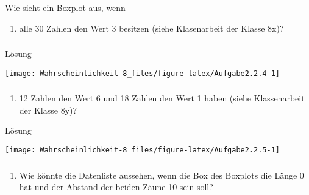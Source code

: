 \documentclass[
  ngerman,
]{book}
\providecommand{\tightlist}{%
  \setlength{\itemsep}{0pt}\setlength{\parskip}{0pt}}
\begin{document}
Wie sieht ein Boxplot aus, wenn

\begin{enumerate}
\def\labelenumi{\alph{enumi})}
\tightlist
\item
  alle 30 Zahlen den Wert 3 besitzen (siehe Klasenarbeit der Klasse 8x)?
\end{enumerate}

\hypertarget{section-30}{%
\subsubsection*{}\label{section-30}}

Lösung

\begin{center}\texttt{[image: Wahrscheinlichkeit-8\_files/figure-latex/Aufgabe2.2.4-1]} \end{center}

\hypertarget{section-31}{%
\subsubsection*{}\label{section-31}}

\begin{enumerate}
\def\labelenumi{\alph{enumi})}
\setcounter{enumi}{1}
\tightlist
\item
  12 Zahlen den Wert 6 und 18 Zahlen den Wert 1 haben (siehe Klassenarbeit der Klasse 8y)?
\end{enumerate}

Lösung

\begin{center}\texttt{[image: Wahrscheinlichkeit-8\_files/figure-latex/Aufgabe2.2.5-1]} \end{center}

\hypertarget{section-32}{%
\subsubsection*{}\label{section-32}}

\begin{enumerate}
\def\labelenumi{\alph{enumi})}
\setcounter{enumi}{2}
\tightlist
\item
  Wie könnte die Datenliste aussehen, wenn die Box des Boxplots die Länge 0 hat und der Abstand der beiden Zäune 10 sein soll?
\end{enumerate}
\end{document}
